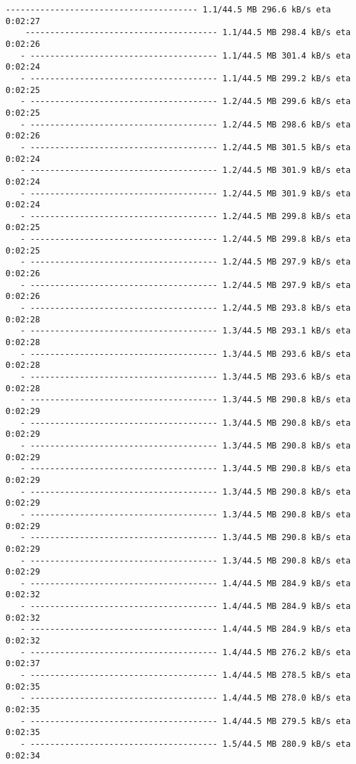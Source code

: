 \documentclass[11pt]{article}
\begin{document}
\begin{Verbatim}[commandchars=\\\{\}]
    --------------------------------------- 1.1/44.5 MB 296.6 kB/s eta 0:02:27
    --------------------------------------- 1.1/44.5 MB 298.4 kB/s eta 0:02:26
   - -------------------------------------- 1.1/44.5 MB 301.4 kB/s eta 0:02:24
   - -------------------------------------- 1.1/44.5 MB 299.2 kB/s eta 0:02:25
   - -------------------------------------- 1.2/44.5 MB 299.6 kB/s eta 0:02:25
   - -------------------------------------- 1.2/44.5 MB 298.6 kB/s eta 0:02:26
   - -------------------------------------- 1.2/44.5 MB 301.5 kB/s eta 0:02:24
   - -------------------------------------- 1.2/44.5 MB 301.9 kB/s eta 0:02:24
   - -------------------------------------- 1.2/44.5 MB 301.9 kB/s eta 0:02:24
   - -------------------------------------- 1.2/44.5 MB 299.8 kB/s eta 0:02:25
   - -------------------------------------- 1.2/44.5 MB 299.8 kB/s eta 0:02:25
   - -------------------------------------- 1.2/44.5 MB 297.9 kB/s eta 0:02:26
   - -------------------------------------- 1.2/44.5 MB 297.9 kB/s eta 0:02:26
   - -------------------------------------- 1.2/44.5 MB 293.8 kB/s eta 0:02:28
   - -------------------------------------- 1.3/44.5 MB 293.1 kB/s eta 0:02:28
   - -------------------------------------- 1.3/44.5 MB 293.6 kB/s eta 0:02:28
   - -------------------------------------- 1.3/44.5 MB 293.6 kB/s eta 0:02:28
   - -------------------------------------- 1.3/44.5 MB 290.8 kB/s eta 0:02:29
   - -------------------------------------- 1.3/44.5 MB 290.8 kB/s eta 0:02:29
   - -------------------------------------- 1.3/44.5 MB 290.8 kB/s eta 0:02:29
   - -------------------------------------- 1.3/44.5 MB 290.8 kB/s eta 0:02:29
   - -------------------------------------- 1.3/44.5 MB 290.8 kB/s eta 0:02:29
   - -------------------------------------- 1.3/44.5 MB 290.8 kB/s eta 0:02:29
   - -------------------------------------- 1.3/44.5 MB 290.8 kB/s eta 0:02:29
   - -------------------------------------- 1.3/44.5 MB 290.8 kB/s eta 0:02:29
   - -------------------------------------- 1.4/44.5 MB 284.9 kB/s eta 0:02:32
   - -------------------------------------- 1.4/44.5 MB 284.9 kB/s eta 0:02:32
   - -------------------------------------- 1.4/44.5 MB 284.9 kB/s eta 0:02:32
   - -------------------------------------- 1.4/44.5 MB 276.2 kB/s eta 0:02:37
   - -------------------------------------- 1.4/44.5 MB 278.5 kB/s eta 0:02:35
   - -------------------------------------- 1.4/44.5 MB 278.0 kB/s eta 0:02:35
   - -------------------------------------- 1.4/44.5 MB 279.5 kB/s eta 0:02:35
   - -------------------------------------- 1.5/44.5 MB 280.9 kB/s eta 0:02:34

\end{Verbatim}
\end{document}
